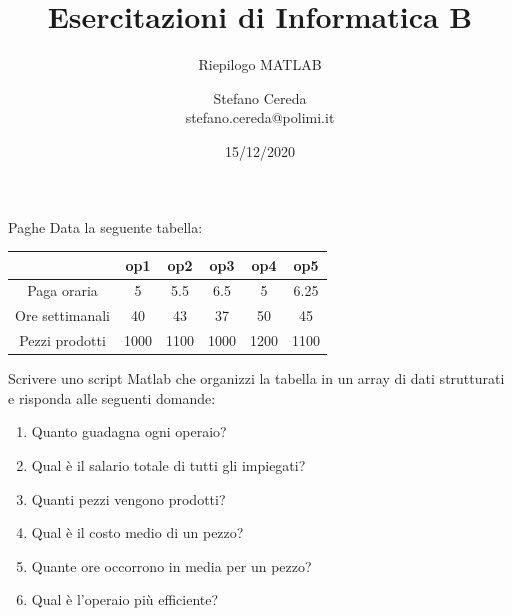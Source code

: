 \documentclass[aspectratio=169, ]{beamer}
\title{Esercitazioni di Informatica B}
\subtitle{Riepilogo MATLAB}
\author{Stefano Cereda\\
	stefano.cereda@polimi.it
}
\date{15/12/2020}
\institute[PoliMi]{Politecnico Milano}
\begin{document}
\begin{frame}
    \maketitle
\end{frame}

%

\begin{frame}{Paghe}
    Data la seguente tabella:

    \begin{tabular}{|c|c|c|c|c|c|}
        \hline
        & op1 & op2 & op3 & op4 & op5 \\
        \hline
        Paga oraria & 5 & 5.5 & 6.5 & 5 & 6.25 \\
        \hline
        Ore settimanali & 40 & 43 & 37 & 50 & 45 \\
        \hline
        Pezzi prodotti & 1000 & 1100 & 1000 & 1200 & 1100 \\
        \hline
    \end{tabular}

    Scrivere uno script Matlab che organizzi la tabella in un array di dati strutturati e risponda alle seguenti domande:
    \begin{enumerate}
        \item Quanto guadagna ogni operaio?
        \item Qual è il salario totale di tutti gli impiegati?
        \item Quanti pezzi vengono prodotti?
        \item Qual è il costo medio di un pezzo?
        \item Quante ore occorrono in media per un pezzo?
        \item Qual è l’operaio più efficiente?
    \end{enumerate}
\end{frame}
\end{document}
